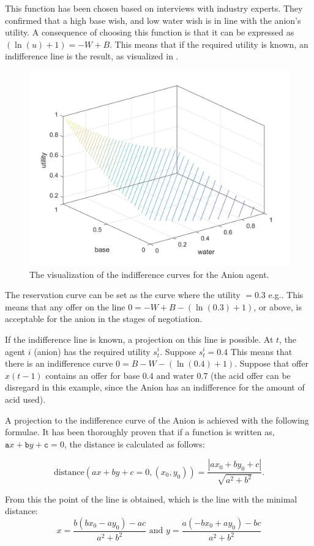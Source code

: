 This function has been chosen based on interviews with industry experts. They confirmed that a high base wish, and low water wish is in line with the anion's utility. A consequence of choosing this function is that it can be expressed as $ (\ln(u)+1) = -W+B$. This means that if the required utility is known, an indifference line is the result, as visualized in .

\begin{figure}[h]
	\centering
	\includegraphics[width=0.7\linewidth]{img/Anion_utility_contour}
	\caption{The visualization of the indifference curves for the Anion agent.}
	\label{fig:anionutilitycontour}
\end{figure}

The reservation curve can be set as the curve where the utility $= 0.3$ e.g.. This means that any offer on the line $0 = - W + B - (\ln(0.3)+1)$, or above, is acceptable for the anion in the stages of negotiation.

If the indifference line is known, a projection on this line is possible. At $t$, the agent $i$ (anion) has the required utility $s^i_t$. Suppose $s^i_t = 0.4$ This means that there is an indifference curve $0 = B - W - (\ln(0.4)+1)$. Suppose that offer $x(t-1)$ contains an offer for base $0.4 \text{ and water } 0.7$ (the acid offer can be disregard in this example, since the Anion has an indifference for the amount of acid used). 

A projection to the indifference curve of the Anion is achieved with the following formulae. It has been thoroughly proven that if a function is written as, $\texttt{a} x + \texttt{b} y + \texttt{c} = 0$, the distance is calculated as follows:

\[\text{distance}(ax+by+c=0, (x_0, y_0)) = \frac{|ax_0+by_0+c|}{\sqrt{a^2+b^2}}. \]

From this the point of the line is obtained, which is the line with the minimal distance:
\[x = \frac{b(bx_0 - ay_0)-ac}{a^2 + b^2} \text{ and } y = \frac{a(-bx_0 + ay_0) - bc}{a^2+b^2}\]

